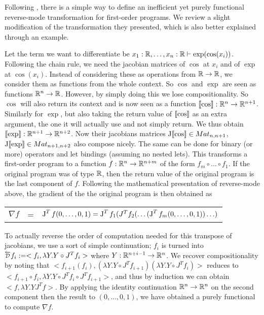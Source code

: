 Following \cite{pearlmutter2008reverse}, there is a simple way to define an inefficient yet purely functional reverse-mode transformation for first-order programs.
We review a slight modification of the transformation they presented, which is also better explained through an example. 

Let the term we want to differentiate be $x_1:\mathbb{R},\ldots,x_n:\mathbb{R}\vdash \exp(\cos(x_i))$.
Following the chain rule, we need the jacobian matrices of $\cos$ at $x_i$ and of $\exp$ at $\cos(x_i)$. 
Instead of considering these as operations from $\mathbb{R}\to\mathbb{R}$, we consider them as functions from the whole context. So $\cos$ and $\exp$ are seen as functions $\mathbb{R}^n\to\mathbb{R}$.
However, by simply doing this we lose compositionality. 
So $\cos$ will also return its context and is now seen as a function $\llbracket \cos\rrbracket:\mathbb{R}^n\to\mathbb{R}^{n+1}$.
Similarly for $\exp$, but also taking the return value of $\llbracket \cos\rrbracket$ as an extra argument, the one it will actually use and not simply return. 
We thus obtain $\llbracket \exp\rrbracket:\mathbb{R}^{n+1}\to\mathbb{R}^{n+2}$. Now their jacobians matrices $\operatorname{J}\llbracket \cos\rrbracket \in Mat_{n,n+1}$, $\operatorname{J}\llbracket \exp\rrbracket \in Mat_{n+1,n+2}$ also compose nicely.
The same can be done for binary (or more) operators and let bindings (assuming no nested lets). 
This transforms a first-order program to a function $f:\mathbb{R}^n\to\mathbb{R}^{n+m}$ of the form $f_m\circ\ldots\circ f_1$. 
If the original program was of type $\mathbb{R}$, then the return value of the original program is the last component of $f$.
Following the mathematical presentation of reverse-mode above, the gradient of the the original program is then obtained as 
\begin{center}
    \begin{tabular}{r c l}
        $\nabla f$ &=& $\operatorname{J}^Tf(0,\ldots,0,1)= \operatorname{J}^Tf_1(J^Tf_{2}(\ldots(\operatorname{J}^Tf_m(0,\ldots,0,1))\ldots)$
    \end{tabular}
\end{center}

To actually reverse the order of computation needed for this transpose of jacobians, we use a sort of simple continuation;
$f_i$ is turned into $\Dsynrevsymbol{f_i}:=<f_i, \lambda Y. Y\circ J^Tf_i>$ where $Y:\mathbb{R}^{n+i-1}\to \mathbb{R}^n$. 
We recover compositionality by noting that $<f_{i+1}(f_i), (\lambda Y. Y\circ J^Tf_{i+1})(\lambda Y. Y\circ J^Tf_i)>$ reduces to
$<f_{i+1}\circ f_i, \lambda Y. Y\circ J^Tf_i \circ J^Tf_{i+1}>$, and thus by induction we can obtain $<f, \lambda Y. YJ^Tf>$.
By applying the identity continuation $\mathbb{R}^n\to\mathbb{R}^n$ on the second component then the result to $(0,\ldots,0,1)$, 
we have obtained a purely functional to compute $\nabla f$. 

